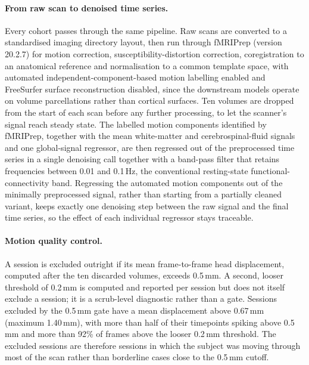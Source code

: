 \paragraph{From raw scan to denoised time series.} Every cohort passes through the same
pipeline. Raw scans are converted to a standardised imaging directory layout, then run
through fMRIPrep (version 20.2.7) for motion correction, susceptibility-distortion
correction, coregistration to an anatomical reference and normalisation to a common
template space, with automated independent-component-based motion labelling enabled and
FreeSurfer surface reconstruction disabled, since the downstream models operate on volume
parcellations rather than cortical surfaces. Ten volumes are dropped from the start of each
scan before any further processing, to let the scanner's signal reach steady state. The
labelled motion components identified by fMRIPrep, together with the mean white-matter and
cerebrospinal-fluid signals and one global-signal regressor, are then regressed out of the
preprocessed time series in a single denoising call together with a band-pass filter that
retains frequencies between 0.01 and 0.1\,Hz, the conventional resting-state
functional-connectivity band. Regressing the automated motion components out of the
minimally preprocessed signal, rather than starting from a partially cleaned variant, keeps
exactly one denoising step between the raw signal and the final time series, so the effect
of each individual regressor stays traceable.

\paragraph{Motion quality control.} A session is excluded outright if its mean
frame-to-frame head displacement, computed after the ten discarded volumes, exceeds
0.5\,mm. A second, looser threshold of 0.2\,mm is computed and reported per session but
does not itself exclude a session; it is a scrub-level diagnostic rather than a gate.
Sessions excluded by the 0.5\,mm gate have a mean displacement above 0.67\,mm (maximum
1.40\,mm), with more than half of their timepoints spiking above 0.5\,mm and more than
92\% of frames above the looser 0.2\,mm threshold. The excluded sessions are therefore
sessions in which the subject was moving through most of the scan rather than borderline
cases close to the 0.5\,mm cutoff.

